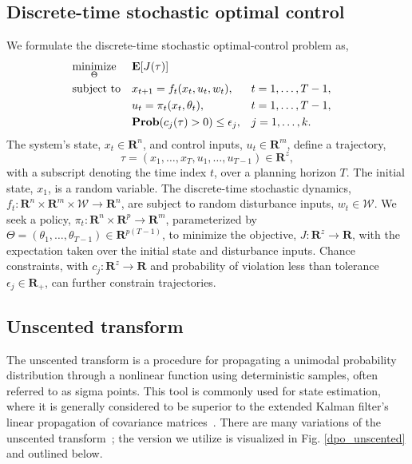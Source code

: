 \subsection{Discrete-time stochastic optimal control}
We formulate the discrete-time stochastic optimal-control problem as, 
\begin{align}
	& \underset{\Theta}{\mbox{minimize}} && \mathbf{E} [ J(\tau) ] \label{dpo_policy_opt}\\
	& \mbox{subject to} && x_{t+1} = f_t(x_t,u_t, w_t),&& t = 1,\dots,T-1, \notag\\
	& && u_t = \pi_t(x_t, \theta_t), && t = 1,\dots,T-1, \notag\\
	& && \mathbf{Prob} (c_j(\tau) > 0 ) \leq \epsilon_j, && j = 1,\dots,k. \notag
\end{align}
The system's state, $x_t \in \mathbf{R}^{n}$, and control inputs, $u_t \in \mathbf{R}^{m}$, define a trajectory, 
\begin{equation}
\tau = (x_1,\dots,x_T,u_1,\dots,u_{T-1}) \in \mathbf{R}^z,
\end{equation}
with a subscript denoting the time index $t$, over a planning horizon $T$. The initial state, $x_1$, is a random variable. The discrete-time stochastic dynamics, $f_t : \mathbf{R}^n \times \mathbf{R}^m \times \mathcal{W} \rightarrow \mathbf{R}^n$, are subject to random disturbance inputs, $w_t \in \mathcal{W}$. We seek a policy, $\pi_t : \mathbf{R}^n \times \mathbf{R}^p \rightarrow \mathbf{R}^m$, parameterized by $\Theta = (\theta_1, \dots, \theta_{T-1}) \in \mathbf{R}^{p(T-1)}$, to minimize the objective, $J : \mathbf{R}^z \rightarrow \mathbf{R}$, with the expectation taken over the initial state and disturbance inputs. Chance constraints, with $c_j : \mathbf{R}^z \rightarrow \mathbf{R}$ and probability of violation less than tolerance $\epsilon_j \in \mathbf{R_{+}}$, can further constrain trajectories.

\subsection{Unscented transform} \label{dpo_ut}

The unscented transform is a procedure for propagating a unimodal probability distribution through a nonlinear function using deterministic samples, often referred to as sigma points. This tool is commonly used for state estimation, where it is generally considered to be superior to the extended Kalman filter's linear propagation of covariance matrices~\cite{uhlmann1995dynamic}. There are many variations of the unscented transform~\cite{menegaz2015systematization}; the version we utilize is visualized in Fig. \ref{dpo_unscented} and outlined below.

